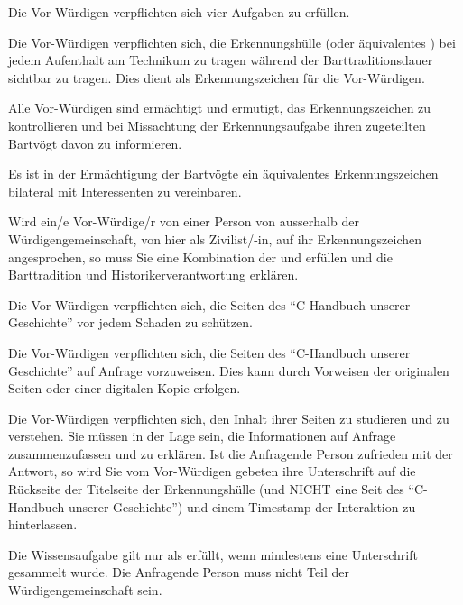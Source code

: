 \documentclass[fontsize=12pt,parskip=half]{scrartcl}
\begin{document}
\begin{contract}
  \Clause[title={Erkennungs-, Schutz-, Vorweis-, Wissensaufgabe}] \label{H.aufgaben}
  Die Vor-Würdigen verpflichten sich vier Aufgaben zu erfüllen.

  \SubClause[title={Erkennungsaufgabe}]\label{H.erkennungsaufgabe}
  Die Vor-Würdigen verpflichten sich, die Erkennungshülle (oder äquivalentes ) bei jedem Aufenthalt am Technikum zu tragen während der
  Barttraditionsdauer sichtbar zu tragen. Dies dient als Erkennungszeichen für die Vor-Würdigen.

  Alle Vor-Würdigen sind ermächtigt und ermutigt, das Erkennungszeichen zu kontrollieren und bei Missachtung der Erkennungsaufgabe ihren zugeteilten Bartvögt davon zu informieren.

  Es ist in der Ermächtigung der Bartvögte ein äquivalentes Erkennungszeichen bilateral mit Interessenten zu vereinbaren.\label{aequivalentes}

  Wird ein/e Vor-Würdige/r von einer Person von ausserhalb der Würdigengemeinschaft, von hier als Zivilist/-in, auf ihr Erkennungszeichen angesprochen, so muss Sie eine Kombination
  der  und  erfüllen und die Barttradition und Historikerverantwortung  erklären.

  \SubClause[title={Schutzaufgabe}]\label{H.schutzaufgabe}
  Die Vor-Würdigen verpflichten sich, die Seiten des ``C-Handbuch unserer Geschichte'' vor jedem Schaden zu schützen.

  \SubClause[title={Vorweisaufgabe}]\label{H.vorweisaufgabe}
  Die Vor-Würdigen verpflichten sich, die Seiten des ``C-Handbuch unserer Geschichte'' auf Anfrage vorzuweisen. Dies kann durch Vorweisen der originalen
  Seiten oder einer digitalen Kopie erfolgen.

  \SubClause[title={Wissensaufgabe}]\label{H.wissensaufgabe}
  Die Vor-Würdigen verpflichten sich, den Inhalt ihrer Seiten zu studieren und zu verstehen. Sie müssen in der Lage sein, die Informationen
  auf Anfrage zusammenzufassen und zu erklären. Ist die Anfragende Person zufrieden mit der Antwort, so wird Sie vom Vor-Würdigen gebeten
  ihre Unterschrift auf die Rückseite der Titelseite der Erkennungshülle (und NICHT eine Seit des ``C-Handbuch unserer Geschichte'') und einem
  Timestamp der Interaktion zu hinterlassen.

  Die Wissensaufgabe gilt nur als erfüllt, wenn mindestens eine Unterschrift gesammelt wurde. Die Anfragende Person muss nicht Teil der Würdigengemeinschaft sein.


\end{contract}
\end{document}
